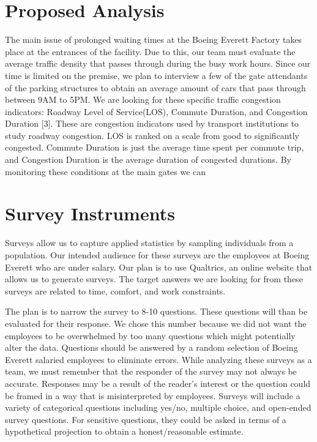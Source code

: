 \documentclass[onecolumn, draftclsnofoot,10pt, compsoc]{IEEEtran}
\begin{document}
\section{Proposed Analysis}
\indent \indent The main issue of prolonged waiting times at the Boeing Everett Factory takes place at the entrances of the facility. 
Due to this, our team must evaluate the average traffic density that passes through during the busy work hours. 
Since our time is limited on the premise, we plan to interview a few of the gate attendants of the parking structures to obtain an average amount of cars that pass through between 9AM to 5PM. 
We are looking for these specific traffic congestion indicators:  Roadway Level of Service(LOS), Commute Duration, and Congestion Duration [3]. 
These are congestion indicators used by transport institutions to study roadway congestion. 
LOS is ranked on a scale from good to significantly congested. Commute Duration is just the average time spent per commute trip, and Congestion Duration is the average duration of congested durations. 
By monitoring these conditions at the main gates we can


\section{Survey Instruments}
\indent \indent Surveys allow us to capture applied statistics by sampling individuals from a population. 
Our intended audience for these surveys are the employees at Boeing Everett who are under salary. 
Our plan is to use Qualtrics, an online website that allows us to generate surveys. 
The target answers we are looking for from these surveys are related to time, comfort, and work constraints. 


The plan is to narrow the survey to 8-10 questions. 
These questions will than be evaluated for their response. 
We chose this number because we did not want the employees to be overwhelmed by too many questions which might potentially alter the data. 
Questions should be answered by a random selection of Boeing Everett salaried employees to eliminate errors. 
While analyzing these surveys as a team, we must remember that the responder of the survey may not always be accurate.
Responses may be a result of the reader’s interest or the question could be framed in a way that is misinterpreted by employees. 
Surveys will include a variety of categorical questions including yes/no, multiple choice, and open-ended survey questions. 
For sensitive questions, they could be asked in terms of a hypothetical projection to obtain a honest/reasonable estimate.
\end{document}
